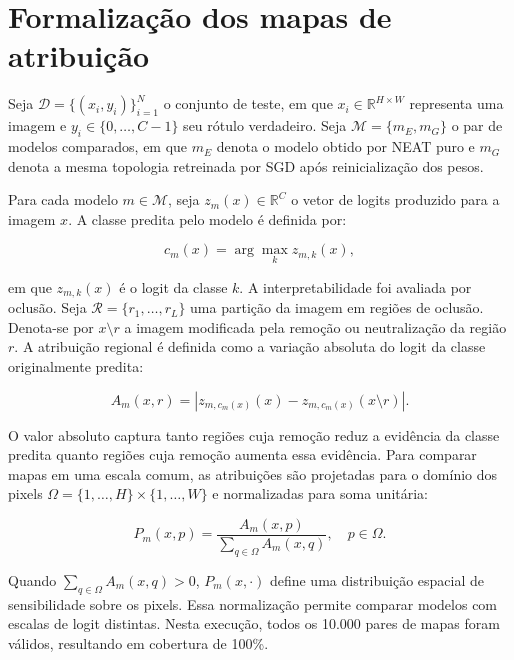 \section{Formaliza\c{c}\~ao dos mapas de atribui\c{c}\~ao}

Seja $\mathcal{D}=\{(x_i,y_i)\}_{i=1}^{N}$ o conjunto de teste, em que
$x_i \in \mathbb{R}^{H \times W}$ representa uma imagem e
$y_i \in \{0,\ldots,C-1\}$ seu r\'otulo verdadeiro. Seja
$\mathcal{M}=\{m_E,m_G\}$ o par de modelos comparados, em que $m_E$ denota o
modelo obtido por NEAT puro e $m_G$ denota a mesma topologia retreinada por SGD
ap\'os reinicializa\c{c}\~ao dos pesos.

Para cada modelo $m \in \mathcal{M}$, seja
$z_m(x)\in\mathbb{R}^{C}$ o vetor de logits produzido para a imagem $x$. A
classe predita pelo modelo \'{e} definida por:

\begin{equation}
c_m(x) = \arg\max_k z_{m,k}(x),
\end{equation}

em que $z_{m,k}(x)$ \'{e} o logit da classe $k$. A interpretabilidade foi avaliada
por oclus\~ao. Seja $\mathcal{R}=\{r_1,\ldots,r_L\}$ uma parti\c{c}\~ao da imagem em
regi\~oes de oclus\~ao. Denota-se por $x\setminus r$ a imagem modificada pela
remo\c{c}\~ao ou neutraliza\c{c}\~ao da regi\~ao $r$. A atribui\c{c}\~ao regional \'{e}
definida como a varia\c{c}\~ao absoluta do logit da classe originalmente predita:

\begin{equation}
A_m(x,r) = \left| z_{m,c_m(x)}(x) -
z_{m,c_m(x)}(x \setminus r) \right|.
\end{equation}

O valor absoluto captura tanto regi\~oes cuja remo\c{c}\~ao reduz a evid\^encia da
classe predita quanto regi\~oes cuja remo\c{c}\~ao aumenta essa evid\^encia. Para
comparar mapas em uma escala comum, as atribui\c{c}\~oes s\~ao projetadas para o
dom\'inio dos pixels $\Omega=\{1,\ldots,H\}\times\{1,\ldots,W\}$ e normalizadas
para soma unit\'aria:

\begin{equation}
P_m(x,p) =
\frac{A_m(x,p)}
{\sum_{q\in\Omega} A_m(x,q)},
\quad p\in\Omega.
\end{equation}

Quando $\sum_{q\in\Omega} A_m(x,q)>0$, $P_m(x,\cdot)$ define uma distribui\c{c}\~ao
espacial de sensibilidade sobre os pixels. Essa normaliza\c{c}\~ao permite comparar
modelos com escalas de logit distintas. Nesta execu\c{c}\~ao, todos os 10.000 pares
de mapas foram v\'alidos, resultando em cobertura de 100\%.

